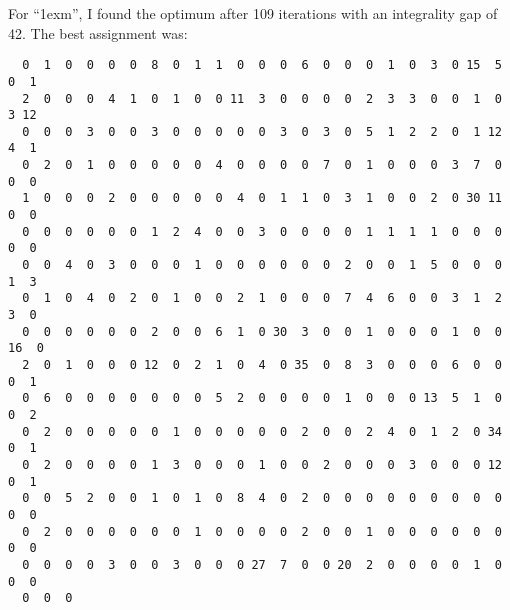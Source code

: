 \documentclass[11pt]{article}
\begin{document}
For ``1exm'', I found the optimum after 109 iterations with an integrality
gap of 42. The best assignment was:

\begin{lstlisting}
  0  1  0  0  0  0  8  0  1  1  0  0  0  6  0  0  0  1  0  3  0 15  5  0  1
  2  0  0  0  4  1  0  1  0  0 11  3  0  0  0  0  2  3  3  0  0  1  0  3 12
  0  0  0  3  0  0  3  0  0  0  0  0  3  0  3  0  5  1  2  2  0  1 12  4  1
  0  2  0  1  0  0  0  0  0  4  0  0  0  0  7  0  1  0  0  0  3  7  0  0  0
  1  0  0  0  2  0  0  0  0  0  4  0  1  1  0  3  1  0  0  2  0 30 11  0  0
  0  0  0  0  0  0  1  2  4  0  0  3  0  0  0  0  1  1  1  1  0  0  0  0  0
  0  0  4  0  3  0  0  0  1  0  0  0  0  0  0  2  0  0  1  5  0  0  0  1  3
  0  1  0  4  0  2  0  1  0  0  2  1  0  0  0  7  4  6  0  0  3  1  2  3  0
  0  0  0  0  0  0  2  0  0  6  1  0 30  3  0  0  1  0  0  0  1  0  0 16  0
  2  0  1  0  0  0 12  0  2  1  0  4  0 35  0  8  3  0  0  0  6  0  0  0  1
  0  6  0  0  0  0  0  0  0  5  2  0  0  0  0  1  0  0  0 13  5  1  0  0  2
  0  2  0  0  0  0  0  1  0  0  0  0  0  2  0  0  2  4  0  1  2  0 34  0  1
  0  2  0  0  0  0  1  3  0  0  0  1  0  0  2  0  0  0  3  0  0  0 12  0  1
  0  0  5  2  0  0  1  0  1  0  8  4  0  2  0  0  0  0  0  0  0  0  0  0  0
  0  2  0  0  0  0  0  0  1  0  0  0  0  2  0  0  1  0  0  0  0  0  0  0  0
  0  0  0  0  3  0  0  3  0  0  0 27  7  0  0 20  2  0  0  0  0  1  0  0  0
  0  0  0
\end{lstlisting}
\end{document}
